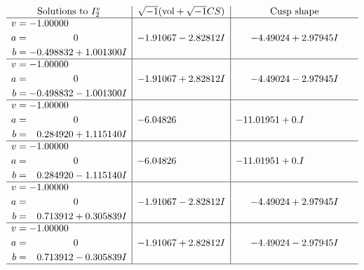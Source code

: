 \documentclass[1p]{elsarticle_modified}
\theoremstyle{definition}
\newcommand{\I}{\sqrt{-1}}
\begin{document}
$$\begin{array}{c|c|c}  
\text{Solutions to }I^v_{2}& \I (\text{vol} + \sqrt{-1}CS) & \text{Cusp shape}\\
 \hline 
\begin{aligned}
v &= -1.00000\phantom{ +0.000000I} \\
a &= \phantom{-0.000000 } 0 \\
b &= -0.498832 + 1.001300 I\end{aligned}
 & -1.91067 - 2.82812 I & -4.49024 + 2.97945 I \\ \hline\begin{aligned}
v &= -1.00000\phantom{ +0.000000I} \\
a &= \phantom{-0.000000 } 0 \\
b &= -0.498832 - 1.001300 I\end{aligned}
 & -1.91067 + 2.82812 I & -4.49024 - 2.97945 I \\ \hline\begin{aligned}
v &= -1.00000\phantom{ +0.000000I} \\
a &= \phantom{-0.000000 } 0 \\
b &= \phantom{-}0.284920 + 1.115140 I\end{aligned}
 & -6.04826\phantom{ +0.000000I} & -11.01951 + 0. I\phantom{ +0.000000I} \\ \hline\begin{aligned}
v &= -1.00000\phantom{ +0.000000I} \\
a &= \phantom{-0.000000 } 0 \\
b &= \phantom{-}0.284920 - 1.115140 I\end{aligned}
 & -6.04826\phantom{ +0.000000I} & -11.01951 + 0. I\phantom{ +0.000000I} \\ \hline\begin{aligned}
v &= -1.00000\phantom{ +0.000000I} \\
a &= \phantom{-0.000000 } 0 \\
b &= \phantom{-}0.713912 + 0.305839 I\end{aligned}
 & -1.91067 - 2.82812 I & -4.49024 + 2.97945 I \\ \hline\begin{aligned}
v &= -1.00000\phantom{ +0.000000I} \\
a &= \phantom{-0.000000 } 0 \\
b &= \phantom{-}0.713912 - 0.305839 I\end{aligned}
 & -1.91067 + 2.82812 I & -4.49024 - 2.97945 I\\
 \hline 
 \end{array}$$\newpage
\end{document}
